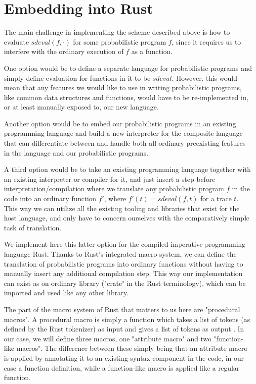 \section{Embedding into Rust}

The main challenge in implementing the scheme described above is how to evaluate $sdeval(f, \cdot)$ for some probabilistic program $f$, since it requires us to interfere with the ordinary execution of $f$ as a function.

One option would be to define a separate language for probabilistic programs and simply define evaluation for functions in it to be $sdeval$. However, this would mean that any features we would like to use in writing probabilistic programs, like common data structures and functions, would have to be re-implemented in, or at least manually exposed to, our new language.

Another option would be to embed our probabilistic programs in an existing programming language and build a new interpreter for the composite language that can differentiate between and handle both all ordinary preexisting features in the language and our probabilistic programs.

A third option would be to take an existing programming language together with an existing interpreter or compiler for it, and just insert a step before interpretation/compilation where we translate any probabilistic program $f$ in the code into an ordinary function $f'$, where $f'(t) = sdeval(f,t)$ for a trace $t$. This way we can utilize all the existing tooling and libraries that exist for the host language, and only have to concern ourselves with the comparatively simple task of translation.

We implement here this latter option for the compiled imperative programming language Rust. Thanks to Rust's integrated macro system, we can define the translation of probabilistic programs into ordinary functions without having to manually insert any additional compilation step. This way our implementation can exist as on ordinary library ("crate" in the Rust terminology), which can be imported and used like any other library.

The part of the macro system of Rust that matters to us here are "procedural macros". A procedural macro is simply a function which takes a list of tokens (as defined by the Rust tokenizer) as input and gives a list of tokens as output \cite{Procedur10:online}. In our case, we will define three macros, one "attribute macro" and two "function-like macros". The difference between these simply being that an attribute macro is applied by annotating it to an existing syntax component in the code, in our case a function definition, while a function-like macro is applied like a regular function.

